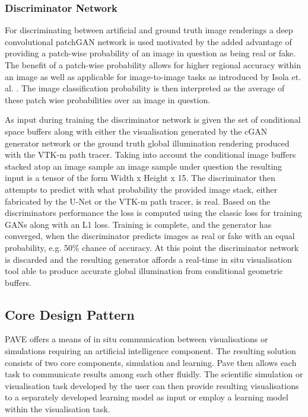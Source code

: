 \documentclass[conference]{IEEEtran}
\begin{document}
\subsubsection{Discriminator Network}

For discriminating between artificial and ground truth image renderings a deep convolutional patchGAN network is used motivated by the added advantage of providing a patch-wise probability of an image in question as being real or fake. The benefit of a patch-wise probability allows for higher regional accuracy within an image as well as applicable for image-to-image tasks as introduced by Isola et. al. \cite{isolaPatch}. The image classification probability is then interpreted as the average of these patch wise probabilities over an image in question. 

As input during training the discriminator network is given the set of conditional space buffers along with either the visualisation generated by the cGAN generator network or the ground truth global illumination rendering produced with the VTK-m path tracer. Taking into account the conditional image buffers stacked atop an image sample an image sample under question the resulting input is a tensor of the form Width x Height x 15. The discriminator then attempts to predict with what probability the provided image stack, either fabricated by the U-Net or the VTK-m path tracer, is real. Based on the discriminators performance the loss is computed using the classic loss for training GANs along with an L1 loss. Training is complete, and the generator has converged, when the discriminator predicts images as real or fake with an equal probability, e.g. 50\% chance of accuracy. At this point the discriminator network is discarded and the resulting generator affords a real-time in situ visualisation tool able to produce accurate global illumination from conditional geometric buffers.


\subsection{Core Design Pattern}
 
PAVE offers a means of in situ communication between visualisations or simulations requiring an artificial intelligence component. The resulting solution consists of two core components, simulation and learning. Pave then allows each task to communicate results among each other fluidly. The scientific simulation or visualisation task developed by the user can then provide resulting visualisations to a separately developed learning model as input or employ a learning model within the visualisation task.  
\end{document}
